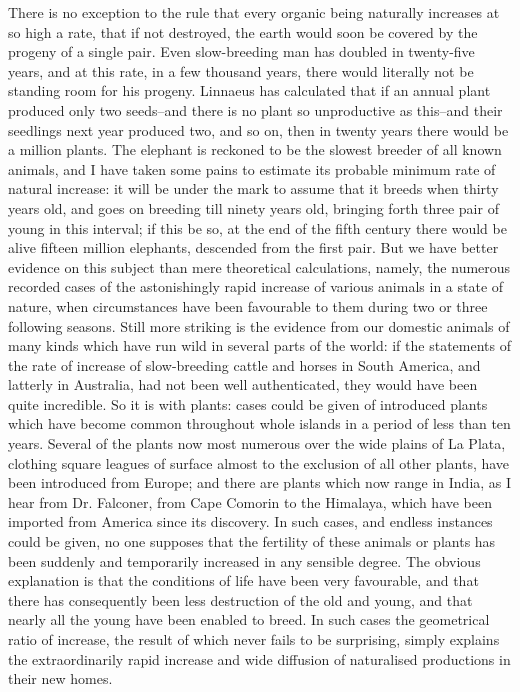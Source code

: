 There is no exception to the rule that every organic being naturally increases at so high a rate, that if not destroyed, the earth would soon be covered by the progeny of a single pair. Even slow-breeding man has doubled in twenty-five years, and at this rate, in a few thousand years, there would literally not be standing room for his progeny. Linnaeus has calculated that if an annual plant produced only two seeds--and there is no plant so unproductive as this--and their seedlings next year produced two, and so on, then in twenty years there would be a million plants. The elephant is reckoned to be the slowest breeder of all known animals, and I have taken some pains to estimate its probable minimum rate of natural increase: it will be under the mark to assume that it breeds when thirty years old, and goes on breeding till ninety years old, bringing forth three pair of young in this interval; if this be so, at the end of the fifth century there would be alive fifteen million elephants, descended from the first pair.
But we have better evidence on this subject than mere theoretical calculations, namely, the numerous recorded cases of the astonishingly rapid increase of various animals in a state of nature, when circumstances have been favourable to them during two or three following seasons. Still more striking is the evidence from our domestic animals of many kinds which have run wild in several parts of the world: if the statements of the rate of increase of slow-breeding cattle and horses in South America, and latterly in Australia, had not been well authenticated, they would have been quite incredible. So it is with plants: cases could be given of introduced plants which have become common throughout whole islands in a period of less than ten years. Several of the plants now most numerous over the wide plains of La Plata, clothing square leagues of surface almost to the exclusion of all other plants, have been introduced from Europe; and there are plants which now range in India, as I hear from Dr. Falconer, from Cape Comorin to the Himalaya, which have been imported from America since its discovery. In such cases, and endless instances could be given, no one supposes that the fertility of these animals or plants has been suddenly and temporarily increased in any sensible degree. The obvious explanation is that the conditions of life have been very favourable, and that there has consequently been less destruction of the old and young, and that nearly all the young have been enabled to breed. In such cases the geometrical ratio of increase, the result of which never fails to be surprising, simply explains the extraordinarily rapid increase and wide diffusion of naturalised productions in their new homes.

